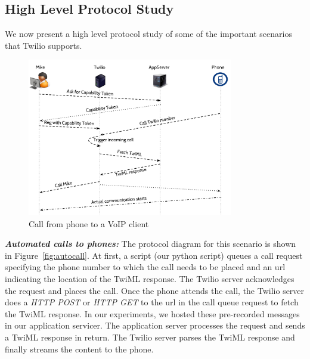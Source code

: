 \subsection{High Level Protocol Study}
\label{subsec-protostudy}
We now present a high level protocol study of some of the important scenarios that Twilio supports. 

 
\begin{figure}[t!] 
\centering
  \includegraphics[width=0.8\textwidth]{figs/p2c.pdf}
\caption{Call from phone to a VoIP client}
\label{fig:callfromphone}
\end{figure}

\emph{\textbf{Automated calls to phones:} }
The protocol diagram for this scenario is shown in  Figure~\ref{fig:autocall}. At first, a script (our python script) queues a call request specifying the phone number to which the call needs to be placed and an url indicating the location of the TwiML response. The Twilio server acknowledges the request and places the call. Once the phone attends the call, the Twilio server does a \textit{HTTP POST} or \textit{HTTP GET} to the url in the call queue request to fetch the TwiML response. In our experiments, we hosted these pre-recorded messages in our application servicer. The application server processes the request and sends a TwiML response in return. The Twilio server parses the TwiML response and finally streams the content to the phone.  

